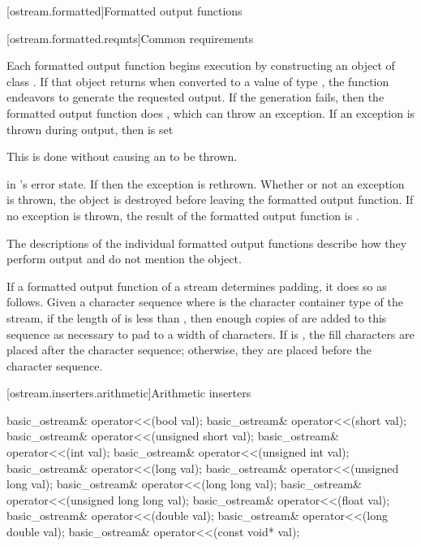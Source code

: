 [ostream.formatted]{Formatted output functions}

[ostream.formatted.reqmts]{Common requirements}

\pnum
Each formatted output function begins execution by constructing an object of class
.
If that object returns
when converted to a value of type
,
the function endeavors
to generate the requested output.
If the generation fails, then the formatted output function does
,
which can throw an exception.
If an exception is thrown during output, then
is set
\begin{footnote}
This is done without causing an
to be thrown.
\end{footnote}
in
's
error state.
If
then the exception is rethrown.
Whether or not an exception is thrown, the
object is destroyed before leaving the formatted output function.
If no exception is thrown, the result of the formatted output function
is
.

\pnum
The descriptions of the individual formatted output functions
describe how they perform
output and do not mention the
object.

\pnum
If a formatted output function of a stream  determines
padding, it does so as
follows. Given a  character sequence  where
 is the character container type of the stream, if
the length of  is less than , then enough copies of
 are added to this sequence as necessary to pad to a
width of  characters. If
 is
, the fill characters are placed
after the character sequence; otherwise, they are placed before the
character sequence.

[ostream.inserters.arithmetic]{Arithmetic inserters}

%
\begin{itemdecl}
basic_ostream& operator<<(bool val);
basic_ostream& operator<<(short val);
basic_ostream& operator<<(unsigned short val);
basic_ostream& operator<<(int val);
basic_ostream& operator<<(unsigned int val);
basic_ostream& operator<<(long val);
basic_ostream& operator<<(unsigned long val);
basic_ostream& operator<<(long long val);
basic_ostream& operator<<(unsigned long long val);
basic_ostream& operator<<(float val);
basic_ostream& operator<<(double val);
basic_ostream& operator<<(long double val);
basic_ostream& operator<<(const void* val);
\end{itemdecl}

